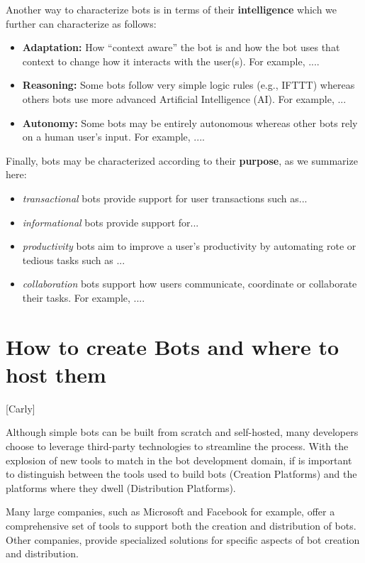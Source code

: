 \documentclass{sig-alternate}
\begin{document}
Another way to characterize bots is in terms of their \textbf{intelligence} which we further can characterize as follows:
\begin{itemize}
\item \textbf{Adaptation:} How ``context aware'' the bot is and how the bot uses that context to change how it interacts with the user(s).  For example, ....
\item \textbf{Reasoning:} Some bots follow very simple logic rules (e.g., IFTTT) whereas others bots use more advanced Artificial Intelligence (AI).  For example, ...
\item \textbf{Autonomy:}  Some bots may be entirely autonomous whereas other bots rely on a human user's input.  For example, ....
\end{itemize}



Finally, bots may be characterized according to their \textbf{purpose}, as we summarize here: 
\begin{itemize}
\item \emph{transactional} bots provide support for user transactions such as...
\item \emph{informational} bots provide support for...
\item \emph{productivity} bots aim to improve a user's productivity by automating rote or tedious tasks such as ... 
\item \emph{collaboration} bots support how users communicate, coordinate or collaborate their tasks.  For example, ....
\end{itemize}
	
	
\section{How to create Bots and where to host them}

	[Carly]

	Although simple bots can be built from scratch and self-hosted, many developers choose to leverage third-party technologies to streamline the process. With the explosion of new tools to match in the bot development domain, if is important to distinguish between the tools used to build bots (Creation Platforms) and the platforms where they dwell (Distribution Platforms).

	Many large companies, such as Microsoft and Facebook for example, offer a comprehensive set of tools to support both the creation and distribution of bots. Other companies, provide specialized solutions for specific aspects of bot creation and distribution. 
\end{document}
